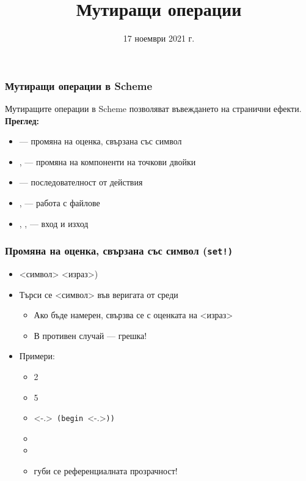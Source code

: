 \documentclass[alsotrans]{beamerswitch}
\title{Мутиращи операции}
\date{17 ноември 2021 г.}
\begin{document}
\begin{frame}
  \titlepage
\end{frame}

\begin{frame}
  \frametitle{Мутиращи операции в Scheme}

  Мутиращите операции в Scheme позволяват въвеждането на \alert{странични ефекти}.\\[4ex]
  \pause
  \textbf{Преглед:}
  \begin{itemize}[<+->]
  \item {} --- промяна на оценка, свързана със символ
  \item {},  --- промяна на компоненти на точкови двойки
  \item {} --- последователност от действия
  \item {},  --- работа с файлове
  \item {}, ,  --- вход и изход
  \end{itemize}
\end{frame}

\begin{frame}[fragile]
  \frametitle{Промяна на оценка, свързана със символ (\tt{set!})}

  \begin{itemize}[<+->]
  \item {} <символ> <израз>\tta)
  \item Търси се <символ> във веригата от среди
    \begin{itemize}
    \item Ако бъде намерен, свързва се с оценката на <израз>
    \item В противен случай --- \alert{грешка!}
    \end{itemize}
  \item Примери:
    \begin{itemize}
    \item {}\hspace{3em}2
    \item {}\hspace{4em}5
    \item {}\only<-.>{\tt{ (begin }}\only<-.>{\tt)}\tt)\pause
    \item {}
    \item {}
    \item \alert{губи се референциалната прозрачност!}
    \end{itemize}
  \end{itemize}
\end{frame}
\end{document}
